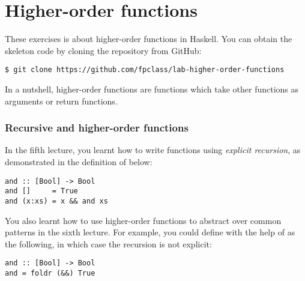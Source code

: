 \section{Higher-order functions}

These exercises is about higher-order functions in Haskell. You can obtain the skeleton code by cloning the repository from GitHub:
\begin{verbatim}
$ git clone https://github.com/fpclass/lab-higher-order-functions
\end{verbatim}
In a nutshell, higher-order functions are functions which take other functions as arguments or return functions.

\taskLine


\taskLine

\subsubsection{Recursive and higher-order functions}

In the fifth lecture, you learnt how to write functions using \emph{explicit recursion}, as demonstrated in the definition of  below:
\begin{verbatim}
and :: [Bool] -> Bool
and []     = True 
and (x:xs) = x && and xs
\end{verbatim}
You also learnt how to use higher-order functions to abstract over common patterns in the sixth lecture. For example, you could define  with the help of  as the following, in which case the recursion is not explicit:
\begin{verbatim}
and :: [Bool] -> Bool 
and = foldr (&&) True
\end{verbatim} 

